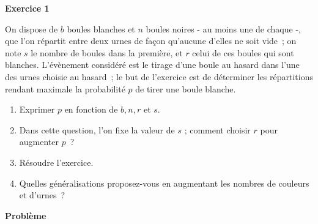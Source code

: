 \documentclass[a4paper,12pt]{article}
\begin{document}
\begin{center}\textbf{{\color{blue} Exercice 1}}
\end{center}

On dispose de $b$ boules blanches et $n$ boules noires - au moins une de
chaque -, que l'on répartit entre deux urnes de façon qu'aucune d'elles ne
soit vide~; on note $s$ le nombre de boules dans la première, et $r$ celui
de ces boules qui sont blanches. L'évènement considéré est le tirage d'une
boule au hasard dans l'une des urnes choisie au hasard~; le but de
l'exercice est de déterminer les répartitions rendant maximale la
probabilité $p$ de tirer une boule blanche.

\medskip

\begin{enumerate}
\item Exprimer $p$ en fonction de $b, n, r$ et $s$.
\item Dans cette question, l'on fixe la valeur de $s$ ;
comment choisir $r$ pour augmenter $p$~?
\item Résoudre l'exercice.
\item Quelles généralisations proposez-vous en augmentant les nombres
de couleurs et d'urnes~?
\end{enumerate}

\begin{center}\textbf{\color{blue} Problème}
\end{center}
\end{document}
